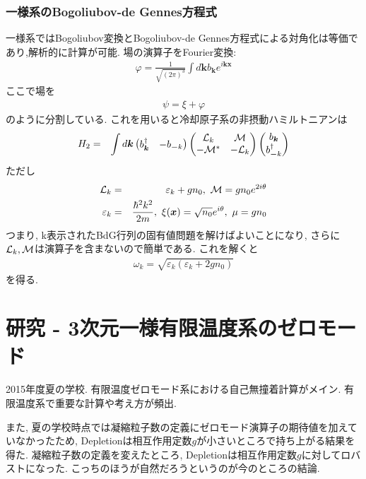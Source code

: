 \documentclass[10.5pt,a4paper]{jreport}
\newcommand{\calM}{{\cal M}}
\newcommand{\calL}{{\cal L}}
\begin{document}
\subsection{一様系のBogoliubov-de Gennes方程式}
一様系ではBogoliubov変換とBogoliubov-de Gennes方程式による対角化は等価であり,解析的に計算が可能. 場の演算子をFourier変換:
\begin{eqnarray}
  \varphi = \frac{1}{\sqrt{(2\pi)^3}}\int d\bm{k} b_{\bm k}e^{i\bm{kx}}
\end{eqnarray}
ここで場を
\begin{eqnarray}
  \psi = \xi + \varphi
\end{eqnarray}
のように分割している. これを用いると冷却原子系の非摂動ハミルトニアンは
\begin{eqnarray}
  H_2 &=& \int d\bm{k}
  \begin{pmatrix}
    b_{\bm k}^\dagger &-b_{\bm -k} 
  \end{pmatrix}
  \begin{pmatrix}
    \calL_k &\calM\\
    -\calM^* &-\calL_k
  \end{pmatrix}
  \begin{pmatrix}
    b_{\bm k}\\
    b_{\bm -k}^\dagger 
  \end{pmatrix}
\end{eqnarray}
ただし
\begin{eqnarray}
  \calL_k &=& \varepsilon_k + gn_0,\ \calM = gn_0e^{2i\theta}\\
  \varepsilon_k &=& \frac{\hbar^2k^2}{2m},\ \xi(\bm{x}) = \sqrt{n_0}e^{i\theta},\ \mu = gn_0
\end{eqnarray}
つまり, k表示されたBdG行列の固有値問題を解けばよいことになり, さらに$\calL_k, \calM$は演算子を含まないので簡単である. これを解くと
\begin{eqnarray}
  \omega_k = \sqrt{\varepsilon_k(\varepsilon_k + 2gn_0)}
\end{eqnarray}
を得る.
\newpage
\chapter{研究 - 3次元一様有限温度系のゼロモード}
2015年度夏の学校. 有限温度ゼロモード系における自己無撞着計算がメイン. 有限温度系で重要な計算や考え方が頻出.

また, 夏の学校時点では凝縮粒子数の定義にゼロモード演算子の期待値を加えていなかったため, Depletionは相互作用定数$g$が小さいところで持ち上がる結果を得た. 凝縮粒子数の定義を変えたところ, Depletionは相互作用定数$g$に対してロバストになった. こっちのほうが自然だろうというのが今のところの結論. 
\end{document}
